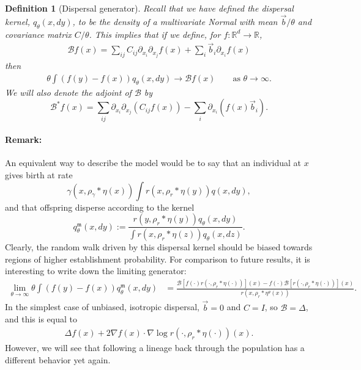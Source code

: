 \documentclass[12pt]{article}
\newtheorem{definition}[theorem]{Definition}
\newcommand{\IR}{\mathbb R}
\newcommand{\grad}{\nabla}
\newcommand{\DG}{\mathcal{B}}  %
\newcommand{\meanq}{\vec b}    %
\newcommand{\covq}{C}     %
\newcommand{\kernel}{\rho}  %
\newcommand{\smooth}[1]{\kernel_{#1} \! * \!}  %
\begin{document}
\begin{definition}[Dispersal generator]
    \label{def:dispersal_generator}
    Recall that we have defined the dispersal kernel,
    $q_\theta(x, dy)$,
    to be the density of a multivariate Normal
    with mean $\meanq/\theta$ and covariance matrix $\covq/\theta$.
    This implies that if we define, for $f : \IR^d \to \IR$,
    \begin{align}
    \DG f(x)
        =
        \sum_{ij} \covq_{ij} \partial_{x_i} \partial_{x_j} f(x)
        + \sum_i \meanq_i \partial_{x_i} f(x)
    \end{align}
    then
    \begin{align}
        \theta \int \left(
            f(y) - f(x)
        \right) q_\theta(x, dy)
    \to \DG f(x) 
        \qquad \text{as } \theta \to \infty .
    \end{align}
    We will also denote the adjoint of $\DG$ by
    $$
    \DG^* f(x)
        =
        \sum_{ij} \partial_{x_i} \partial_{x_j} (\covq_{ij} f(x))
        - \sum_i \partial_{x_i} (f(x) \meanq_i) .
    $$
\end{definition}

\paragraph{Remark:}
An equivalent way to describe the model
would be to say that an individual at $x$ gives birth at rate
$$
    \gamma(x, \smooth{\gamma} \eta(x))
    \int r(x, \smooth{r} \eta(y)) q(x, dy) ,
$$
and that offspring disperse according to the kernel
$$
    q_\theta^\mathfrak{m}(x, dy)
    :=
    \frac{
        r(y, \smooth{r} \eta(y)) q_\theta(x, dy)
    }{
        \int r(x, \smooth{r} \eta(z)) q_\theta(x, dz)
    } .
$$
Clearly, the random walk driven by this dispersal kernel
should be biased towards regions of higher establishment probability.
For comparison to future results,
it is interesting to write down the limiting generator:
\begin{align*}
    \lim_{\theta \to \infty}
    \theta \int (f(y) - f(x)) q_\theta^\mathfrak{m}(x, dy)
    &=
    \frac{
        \DG\left[ f(\cdot) r(\cdot, \smooth{r} \eta(\cdot)) \right](x)
        - 
        f(\cdot) \DG\left[ r(\cdot, \smooth{r} \eta(\cdot)) \right](x)
    }{
        r(x, \smooth{r} \eta^{\theta}(x))
    } .
\end{align*}
In the simplest case of unbiased, isotropic dispersal,
$\meanq = 0$ and $\covq = I$, so $\DG = \Delta$,
and this is equal to
\begin{align*}
    \Delta f(x) + 2 \grad f(x) \cdot \grad \log r(\cdot, \smooth{r} \eta(\cdot))(x) .
\end{align*}
However, we will see that following a lineage back through the population
has a different behavior yet again.
\end{document}
